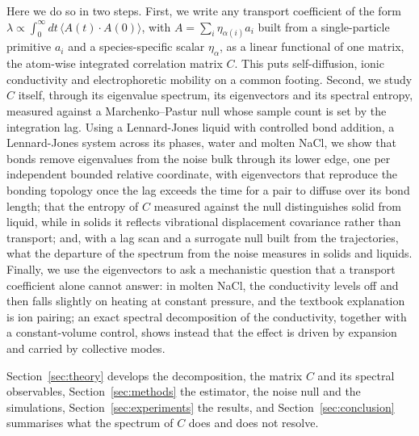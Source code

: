 Here we do so in two steps.
First, we write any transport coefficient of the form $\lambda \propto \int_{0}^{\infty} dt\, \langle A(t) \cdot A(0) \rangle$, with $A = \sum_{i} \eta_{\alpha(i)} a_{i}$ built from a single-particle primitive $a_{i}$ and a species-specific scalar $\eta_{\alpha}$, as a linear functional of one matrix, the atom-wise integrated correlation matrix $C$.
This puts self-diffusion, ionic conductivity and electrophoretic mobility on a common footing.
Second, we study $C$ itself, through its eigenvalue spectrum, its eigenvectors and its spectral entropy, measured against a Marchenko--Pastur null whose sample count is set by the integration lag.
Using a Lennard-Jones liquid with controlled bond addition, a Lennard-Jones system across its phases, water and molten NaCl, we show that bonds remove eigenvalues from the noise bulk through its lower edge, one per independent bounded relative coordinate, with eigenvectors that reproduce the bonding topology once the lag exceeds the time for a pair to diffuse over its bond length; that the entropy of $C$ measured against the null distinguishes solid from liquid, while in solids it reflects vibrational displacement covariance rather than transport; and, with a lag scan and a surrogate null built from the trajectories, what the departure of the spectrum from the noise measures in solids and liquids.
Finally, we use the eigenvectors to ask a mechanistic question that a transport coefficient alone cannot answer: in molten NaCl, the conductivity levels off and then falls slightly on heating at constant pressure, and the textbook explanation is ion pairing; an exact spectral decomposition of the conductivity, together with a constant-volume control, shows instead that the effect is driven by expansion and carried by collective modes.

Section~\ref{sec:theory} develops the decomposition, the matrix $C$ and its spectral observables, Section~\ref{sec:methods} the estimator, the noise null and the simulations, Section~\ref{sec:experiments} the results, and Section~\ref{sec:conclusion} summarises what the spectrum of $C$ does and does not resolve.
